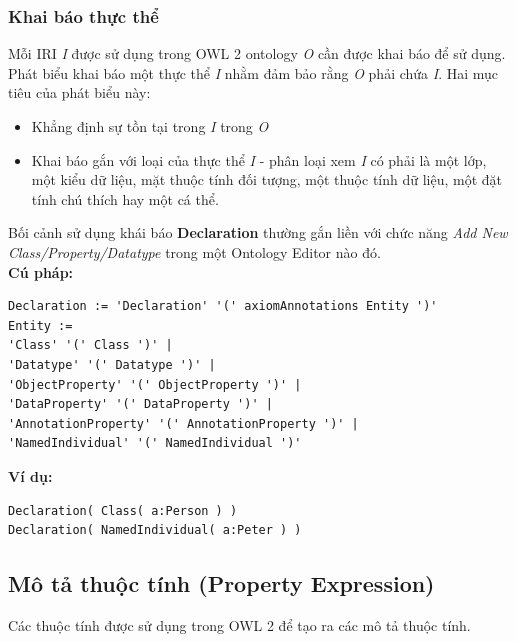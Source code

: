 \subsubsection{Khai báo thực thể}
Mỗi IRI \textit{I} được sử dụng trong OWL 2 ontology \textit{O} cần được khai báo để sử dụng. Phát biểu khai báo một thực thể \textit{I} nhằm đảm bảo rằng \textit{O} phải chứa \textit{I}. Hai mục tiêu của phát biểu này:
\begin{itemize}
\item Khẳng định sự tồn tại trong \textit{I} trong \textit{O}
\item Khai báo gắn với loại của thực thể \textit{I} - phân loại xem \textit{I} có phải là một lớp, một kiểu dữ liệu, mặt thuộc tính đối tượng, một thuộc tính dữ liệu, một đặt tính chú thích hay một cá thể.
\end{itemize}
Bối cảnh sử dụng khái báo \textbf{Declaration} thường gắn liền với chức năng \textit{Add New Class/Property/Datatype} trong một Ontology Editor nào đó.
\\ \textbf{Cú pháp:}
\begin{verbatim}
Declaration := 'Declaration' '(' axiomAnnotations Entity ')'
Entity :=
'Class' '(' Class ')' |
'Datatype' '(' Datatype ')' |
'ObjectProperty' '(' ObjectProperty ')' |
'DataProperty' '(' DataProperty ')' |
'AnnotationProperty' '(' AnnotationProperty ')' |
'NamedIndividual' '(' NamedIndividual ')'
\end{verbatim}
\textbf{Ví dụ:}
\begin{verbatim}
Declaration( Class( a:Person ) )
Declaration( NamedIndividual( a:Peter ) )
\end{verbatim}

\subsection{Mô tả thuộc tính (Property Expression)}
Các thuộc tính được sử dụng trong OWL 2 để tạo ra các mô tả thuộc tính.

